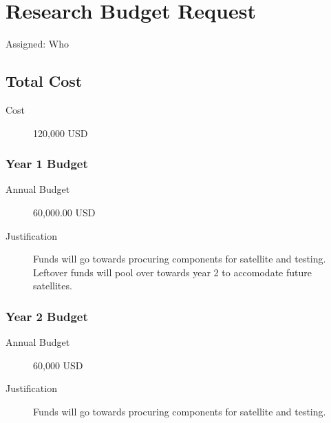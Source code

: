 \section{Research Budget Request}
Assigned: Who

\subsection{Total Cost}
\begin{description}
\item[Cost] 120,000 USD
\end{description}

\subsubsection{Year 1 Budget}
\begin{description}
\item[Annual Budget] 60,000.00 USD
\item[Justification] Funds will go towards procuring components for
  satellite and testing. Leftover funds will pool over towards year 2
  to accomodate future satellites.
\end{description}

\subsubsection{Year 2 Budget}
\begin{description}
\item[Annual Budget] 60,000 USD
\item[Justification] Funds will go towards procuring components for
  satellite and testing.
\end{description}

